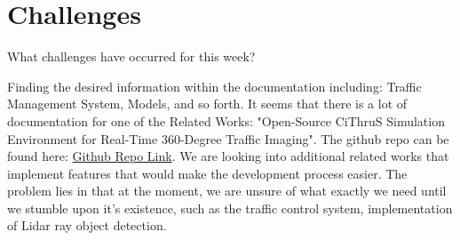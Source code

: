 \section{Challenges}

What challenges have occurred for this week?

Finding the desired information within the documentation including: Traffic Management System, Models, and so forth.
It seems that there is a lot of documentation for one of the Related Works: "Open-Source CiThruS Simulation Environment for Real-Time 360-Degree Traffic Imaging".
The github repo can be found here: \href{https://github.com/ultravideo/CiThruS-simulation-environment}{Github Repo Link}.
We are looking into additional related works that implement features that would make the development process easier.
The problem lies in that at the moment, we are unsure of what exactly we need until we stumble upon it's existence, such as the traffic control system, implementation of Lidar ray object detection.